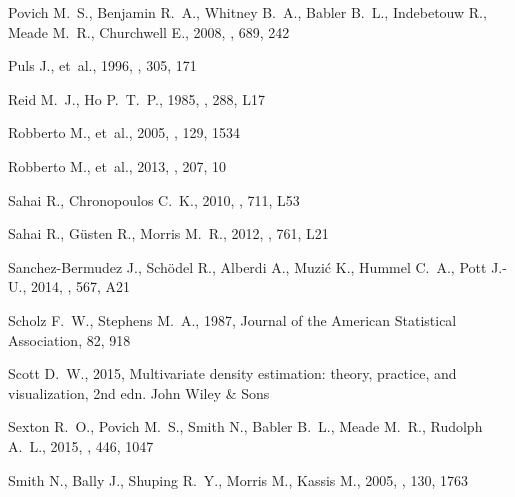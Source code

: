 \documentclass[useAMS, usenatbib, a4paper]{mnras}
\begin{document}
\begin{thebibliography}{}
{Povich} M.~S.,  {Benjamin} R.~A.,  {Whitney} B.~A.,  {Babler} B.~L.,
  {Indebetouw} R.,  {Meade} M.~R.,   {Churchwell} E.,  2008, \apj, 689, 242

{Puls} J.,  et~al., 1996, \aap, 305, 171

{Reid} M.~J.,  {Ho} P.~T.~P.,  1985, \apjl, 288, L17

{Robberto} M.,  et~al., 2005, \aj, 129, 1534

{Robberto} M.,  et~al., 2013, \apjs, 207, 10

{Sahai} R.,  {Chronopoulos} C.~K.,  2010, \apjl, 711, L53

{Sahai} R.,  {Güsten} R.,   {Morris} M.~R.,  2012, \apjl, 761, L21

{Sanchez-Bermudez} J.,  {Schödel} R.,  {Alberdi} A.,  {Muzić} K.,  {Hummel}
  C.~A.,   {Pott} J.-U.,  2014, \aap, 567, A21

Scholz F.~W.,  Stephens M.~A.,  1987, Journal of the American Statistical
  Association, 82, 918

Scott D.~W.,  2015, Multivariate density estimation: theory, practice, and
  visualization, 2nd edn.
John Wiley \& Sons

{Sexton} R.~O.,  {Povich} M.~S.,  {Smith} N.,  {Babler} B.~L.,  {Meade} M.~R.,
   {Rudolph} A.~L.,  2015, \mnras, 446, 1047

{Smith} N.,  {Bally} J.,  {Shuping} R.~Y.,  {Morris} M.,   {Kassis} M.,  2005,
  \aj, 130, 1763


\end{thebibliography}
\end{document}
